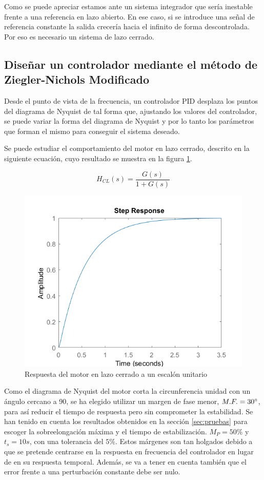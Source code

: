 \documentclass[a4paper]{article}
\begin{document}
Como se puede apreciar estamos ante un sistema integrador que sería inestable frente a una referencia en lazo abierto. En ese caso, si se introduce una señal de referencia constante la salida crecería hacia el infinito de forma descontrolada. Por eso es necesario un sistema de lazo cerrado.

\subsection{Diseñar un controlador mediante el método de Ziegler-Nichols Modificado}
Desde el punto de vista de la frecuencia, un controlador PID desplaza los puntos del diagrama de Nyquist de tal forma que, ajustando los valores del controlador, se puede variar la forma del diagrama de Nyquist y por lo tanto los parámetros que forman el mismo para conseguir el sistema deseado.

Se puede estudiar el comportamiento del motor en lazo cerrado, descrito en la siguiente ecuación, cuyo resultado se muestra en la figura \ref{fig:cl}.

\begin{equation}
H_{CL}(s)=\frac{G(s)}{1 + G(s)}
\end{equation}

\begin{center}
	\begin{figure}
		\centering
		\includegraphics[width=12cm]{lazo_cerrado}
		\caption{Respuesta del motor en lazo cerrado a un escalón unitario}
		\label{fig:cl}
	\end{figure}
\end{center}

Como el diagrama de Nyquist del motor corta la circunferencia unidad con un ángulo cercano a 90\degree, se ha elegido utilizar un margen de fase menor, $M.F. = 30\degree$, para así reducir el tiempo de respuesta pero sin comprometer la estabilidad. Se han tenido en cuenta los resultados obtenidos en la sección \ref{sec:pruebas} para escoger la sobreelongación máxima y el tiempo de estabilización. $M_P=50\%$ y $t_s=10 s$, con una tolerancia del $5\%$. Estos márgenes son tan holgados debido a que se pretende centrarse en la respuesta en frecuencia del controlador en lugar de en su respuesta temporal. Además, se va a tener en cuenta también que el error frente a una perturbación constante debe ser nulo.
\end{document}
